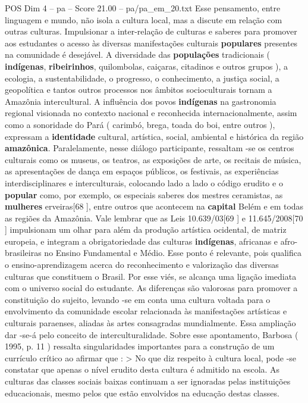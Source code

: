 \begin{textsample}{POS Dim 4 – pa – Score 21.00 – pa/pa\_em\_20.txt}
Esse pensamento, entre linguagem e mundo, não isola a cultura local, mas a discute em relação com outras culturas.
Impulsionar a inter-relação de culturas e saberes para promover aos estudantes o acesso às diversas manifestações culturais \textbf{populares} presentes na comunidade é desejável.
A diversidade das \textbf{populações} tradicionais ( \textbf{indígenas}, \textbf{ribeirinhos}, quilombolas, caiçaras, citadinos e outros grupos ), a ecologia, a sustentabilidade, o progresso, o conhecimento, a justiça social, a geopolítica e tantos outros processos nos âmbitos socioculturais tornam a Amazônia intercultural.
A influência dos povos \textbf{indígenas} na gastronomia regional visionada no contexto nacional e reconhecida internacionalmente, assim como a sonoridade do Pará ( carimbó, brega, toada do boi, entre outros ), expressam a \textbf{identidade} cultural, artística, social, ambiental e histórica da região \textbf{amazônica}.
Paralelamente, nesse diálogo participante, ressaltam -se os centros culturais como os museus, os teatros, as exposições de arte, os recitais de música, as apresentações de dança em espaços públicos, os festivais, as experiências interdisciplinares e interculturais, colocando lado a lado o código erudito e o \textbf{popular} como, por exemplo, os especiais saberes dos mestres ceramistas, as \textbf{mulheres} erveiras[68 ], entre outros que acontecem na \textbf{capital} Belém e em todas as regiões da Amazônia.
Vale lembrar que as Leis 10.639/03[69 ] e 11.645/2008[70 ] impulsionam um olhar para além da produção artística ocidental, de matriz europeia, e integram a obrigatoriedade das culturas \textbf{indígenas}, africanas e afro-brasileiras no Ensino Fundamental e Médio.
Esse ponto é relevante, pois qualifica o ensino-aprendizagem acerca do reconhecimento e valorização das diversas culturas que constituem o Brasil.
Por esse viés, se alcança uma ligação imediata com o universo social do estudante.
As diferenças são valorosas para promover a constituição do sujeito, levando -se em conta uma cultura voltada para o envolvimento da comunidade escolar relacionada às manifestações artísticas e culturais paraenses, aliadas às artes consagradas mundialmente.
Essa ampliação dar -se-á pelo conceito de interculturalidade.
Sobre esse apontamento, Barbosa ( 1995, p. 11 ) ressalta singularidades importantes para a construção de um currículo crítico ao afirmar que : > No que diz respeito à cultura local, pode -se constatar que apenas o nível erudito desta cultura é admitido na escola.
As culturas das classes sociais baixas continuam a ser ignoradas pelas instituições educacionais, mesmo pelos que estão envolvidos na educação destas classes.

\end{textsample}
